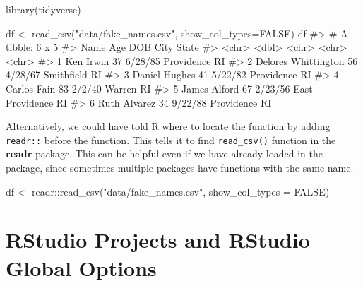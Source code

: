 \documentclass[
  letterpaper,
]{latex/krantz}
\makeatletter
\newenvironment{Shaded}{\begin{snugshade}}{\end{snugshade}}
\newcommand{\AttributeTok}[1]{\textcolor[rgb]{0.40,0.45,0.13}{#1}}
\newcommand{\CommentTok}[1]{\textcolor[rgb]{0.37,0.37,0.37}{#1}}
\newcommand{\ConstantTok}[1]{\textcolor[rgb]{0.56,0.35,0.01}{#1}}
\newcommand{\FunctionTok}[1]{\textcolor[rgb]{0.28,0.35,0.67}{#1}}
\newcommand{\NormalTok}[1]{\textcolor[rgb]{0.00,0.23,0.31}{#1}}
\newcommand{\OtherTok}[1]{\textcolor[rgb]{0.00,0.23,0.31}{#1}}
\newcommand{\SpecialCharTok}[1]{\textcolor[rgb]{0.37,0.37,0.37}{#1}}
\newcommand{\StringTok}[1]{\textcolor[rgb]{0.13,0.47,0.30}{#1}}
\newenvironment{kframe}{%
\medskip{}
\setlength{\fboxsep}{.8em}
 \def\at@end@of@kframe{}%
 \ifinner\ifhmode%
  \def\at@end@of@kframe{\end{minipage}}%
  \begin{minipage}{\columnwidth}%
 \fi\fi%
 \def\FrameCommand##1{\hskip\@totalleftmargin \hskip-\fboxsep
 \colorbox{shadecolor}{##1}\hskip-\fboxsep
     \hskip-\linewidth \hskip-\@totalleftmargin \hskip\columnwidth}%
 \MakeFramed {\advance\hsize-\width
   \@totalleftmargin\z@ \linewidth\hsize
   \@setminipage}}%
 {\par\unskip\endMakeFramed%
 \at@end@of@kframe}
\renewenvironment{Shaded}{\begin{kframe}}{\end{kframe}}
\makeatother
\begin{document}
\begin{Shaded}
\begin{Highlighting}[]
\FunctionTok{library}\NormalTok{(tidyverse)}
\end{Highlighting}
\end{Shaded}

\begin{Shaded}
\begin{Highlighting}[]
\NormalTok{df }\OtherTok{\textless{}{-}} \FunctionTok{read\_csv}\NormalTok{(}\StringTok{"data/fake\_names.csv"}\NormalTok{, }\AttributeTok{show\_col\_types=}\ConstantTok{FALSE}\NormalTok{)}
\NormalTok{df}
\CommentTok{\#\textgreater{} \# A tibble: 6 x 5}
\CommentTok{\#\textgreater{}   Name                  Age DOB     City            State}
\CommentTok{\#\textgreater{}   \textless{}chr\textgreater{}               \textless{}dbl\textgreater{} \textless{}chr\textgreater{}   \textless{}chr\textgreater{}           \textless{}chr\textgreater{}}
\CommentTok{\#\textgreater{} 1 Ken Irwin              37 6/28/85 Providence      RI   }
\CommentTok{\#\textgreater{} 2 Delores Whittington    56 4/28/67 Smithfield      RI   }
\CommentTok{\#\textgreater{} 3 Daniel Hughes          41 5/22/82 Providence      RI   }
\CommentTok{\#\textgreater{} 4 Carlos Fain            83 2/2/40  Warren          RI   }
\CommentTok{\#\textgreater{} 5 James Alford           67 2/23/56 East Providence RI   }
\CommentTok{\#\textgreater{} 6 Ruth Alvarez           34 9/22/88 Providence      RI}
\end{Highlighting}
\end{Shaded}

Alternatively, we could have told R where to locate the function by
adding \texttt{readr::} before the function. This tells it to find
\texttt{read\_csv()} function in the \textbf{readr} package. This can be
helpful even if we have already loaded in the package, since sometimes
multiple packages have functions with the same name.

\begin{Shaded}
\begin{Highlighting}[]
\NormalTok{df }\OtherTok{\textless{}{-}}\NormalTok{ readr}\SpecialCharTok{::}\FunctionTok{read\_csv}\NormalTok{(}\StringTok{"data/fake\_names.csv"}\NormalTok{, }\AttributeTok{show\_col\_types =} \ConstantTok{FALSE}\NormalTok{)}
\end{Highlighting}
\end{Shaded}

\section{RStudio Projects and RStudio Global
Options}\label{rstudio-projects-and-rstudio-global-options}
\end{document}
